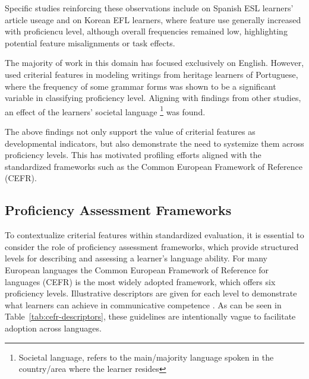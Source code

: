 Specific studies reinforcing these observations include \citet{diez-bedmar2015} on Spanish ESL learners' article
useage and \citet{Kim2021} on Korean EFL learners, where feature use generally increased with proficiencu level,
although overall frequencies remained low, highlighting potential feature misalignments or task effects.

The majority of work in this domain has focused exclusively on English. However, \citet{akef2025} used criterial
features in modeling writings from heritage learners of Portuguese,  where the frequency of some grammar forms
was shown
to be a significant variable in classifying proficiency level. Aligning with findings from other studies, an effect
of the learners' societal language
\footnote{Societal language, refers to the main/majority language spoken in the country/area where the learner resides}
was found.

The above findings not only support the value of criterial features as developmental indicators, but also
demonstrate the need to systemize them across proficiency levels. This has motivated profiling efforts \cite{Saville2010}
aligned
with
the standardized frameworks such as the Common European Framework of Reference (CEFR).



\subsection{Proficiency Assessment Frameworks}



To contextualize criterial features within standardized evaluation, it is essential to consider the role of
proficiency assessment frameworks, which provide structured levels for describing and assessing a learner's language
ability. For many European languages the Common European Framework of Reference for languages (CEFR) is the most
widely adopted framework, which offers six proficiency levels. Illustrative
descriptors are given for each level to demonstrate what learners can achieve in communicative
competence \citep{CEFR2020}. As can be seen in Table~\ref{tab:cefr-descriptors}, these guidelines are intentionally
vague to facilitate
adoption
across
languages.

